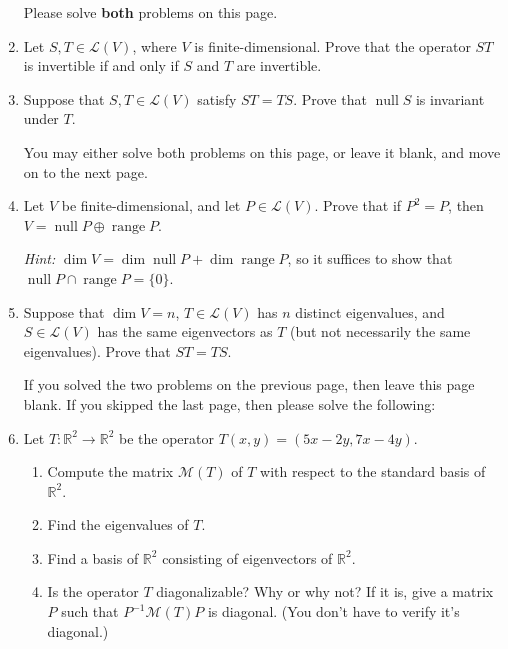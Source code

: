 \documentclass[12pt]{article}
\newcommand{\points}[1]{\marginpar{\hspace{24pt}[#1]}}
\newcommand{\R}{\mathbb{R}}
\DeclareMathOperator{\nul}{null}
\DeclareMathOperator{\range}{range}
\begin{document}
\begin{enumerate}
\begin{enumerate}
\end{enumerate}
\newpage

Please solve {\bf both} problems on this page.

\bigskip

\item Let $S,T\in\mathcal{L}(V)$, where $V$ is finite-dimensional. Prove that the operator $ST$ is invertible if and only if $S$ and $T$ are invertible. \points{6}

\vspace{4in}

\item Suppose that $S,T\in \mathcal{L}(V)$ satisfy $ST=TS$. Prove that $\operatorname{null}S$ is invariant under $T$. \points{6}

\newpage

You may either solve both problems on this page, or leave it blank, and move on to the next page.

\item Let $V$ be finite-dimensional, and let $P\in\mathcal{L}(V)$. Prove that if $P^2=P$, then\\ $V=\nul P\oplus\range P$.\points{6}

{\em Hint:} $\dim V = \dim \nul P+\dim \range P$, so it suffices to show that $\nul P\cap \range P=\{0\}$.

\vspace{3.5in}

\item Suppose that $\dim V = n$, $T\in\mathcal{L}(V)$ has $n$ distinct eigenvalues, and $S\in\mathcal{L}(V)$ has the same eigenvectors as $T$ (but not necessarily the same eigenvalues). Prove that $ST=TS$. \points{6}





\newpage

If you solved the two problems on the previous page, then leave this page blank. If you skipped the last page, then please solve the following:

\item Let $T:\R^2\to\R^2$ be the operator $T(x,y) = (5x-2y,7x-4y)$.
\begin{enumerate}
\item Compute the matrix $\mathcal{M}(T)$ of $T$ with respect to the standard basis of $\R^2$. \points{2}

\vspace{1in}

\item Find the eigenvalues of $T$. \points{4}

\vspace{2in}

\item Find a basis of $\R^2$ consisting of eigenvectors of $\R^2$. \points{4}

\vspace{2.75in}

\item Is the operator $T$ diagonalizable? Why or why not? If it is, give a matrix $P$ such that $P^{-1}\mathcal{M}(T)P$ is diagonal. (You don't have to verify it's diagonal.) \points{2}
\end{enumerate}
\end{enumerate}
\end{document}
